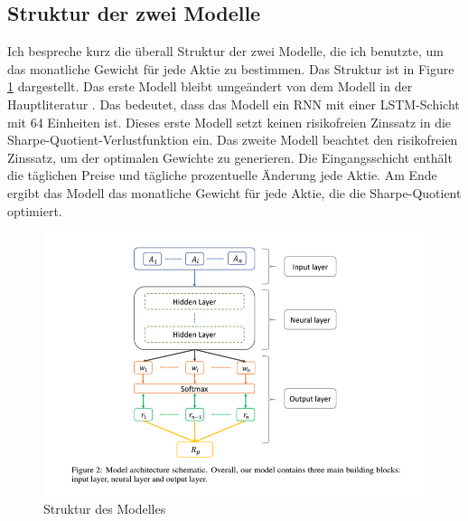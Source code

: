 \documentclass[12pt]{article}
\begin{document}
        \subsection{Struktur der zwei Modelle}

            Ich bespreche kurz die überall Struktur der zwei Modelle, die ich benutzte, 
            um das monatliche Gewicht für jede Aktie zu bestimmen. Das Struktur ist in Figure \ref{Struktur-Modell} dargestellt.
            Das erste Modell bleibt umgeändert von dem Modell in der Hauptliteratur \cite{zhang2020}. 
            Das bedeutet, dass das Modell ein RNN mit einer LSTM-Schicht mit 64 Einheiten ist. 
            Dieses erste Modell setzt keinen risikofreien Zinssatz in die Sharpe-Quotient-Verlustfunktion ein. 
            Das zweite Modell beachtet den risikofreien Zinssatz, um der optimalen Gewichte zu generieren. 
            Die Eingangsschicht enthält die täglichen Preise und tägliche prozentuelle Änderung jede Aktie. 
            Am Ende ergibt das Modell das monatliche Gewicht für jede Aktie, die die Sharpe-Quotient optimiert.

            \begin{figure}[ht]
            
                \begin{center}

                    \includegraphics[scale=1]{zhang-knn.png}
                    \caption{Struktur des Modelles \cite{zhang2020}}
                    \label{Struktur-Modell}
        
                \end{center}
                
            \end{figure}
\end{document}
